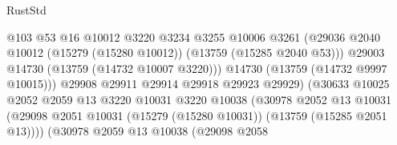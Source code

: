 \begin{lexlean}{RustStd}
\begin{coremodule}
                                              @103
                                              @53
                                              @16
                                              @10012
                                              @3220
                                              @3234
                                              @3255
                                              @10006
                                              @3261
                                              (@29036
                                                @2040
                                                @10012
                                                (@15279 (@15280 @10012))
                                                (@13759 (@15285 @2040 @53)))
                                              @29003
                                              @14730
                                              (@13759 (@14732 @10007 @3220)))
                                            @14730
                                            (@13759 (@14732 @9997 @10015)))
                                          @29908
                                          @29911
                                          @29914
                                          @29918
                                          @29923
                                          @29929)
                                        (@30633
                                          @10025
                                          @2052
                                          @2059
                                          @13
                                          @3220
                                          @10031
                                          @3220
                                          @10038
                                          (@30978
                                            @2052
                                            @13
                                            @10031
                                            (@29098
                                              @2051
                                              @10031
                                              (@15279 (@15280 @10031))
                                              (@13759 (@15285 @2051 @13))))
                                          (@30978
                                            @2059
                                            @13
                                            @10038
                                            (@29098
                                              @2058

\end{coremodule}
\end{lexlean}
